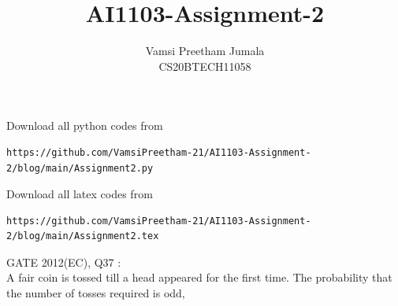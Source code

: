 \documentclass[journal,12pt,twocolumn]{IEEEtran}
\begin{document}
     \def\rightbox#1{\makebox[0in][r]{#1}}
     \def\centbox#1{\makebox[0in]{#1}}
     \def\topbox#1{\raisebox{-\baselineskip}[0in][0in]{#1}}
     \def\midbox#1{\raisebox{-0.5\baselineskip}[0in][0in]{#1}}
\vspace{3cm}
\newtheorem{theorem}{Theorem}[section]
\newtheorem{corollary}{Corollary}[theorem]
\newtheorem{lemma}[theorem]{Lemma}
\title{AI1103-Assignment-2}
\author{Vamsi Preetham Jumala\\CS20BTECH11058}
\maketitle
\newpage
\bigskip
\renewcommand{\thefigure}{\theenumi}
\renewcommand{\thetable}{\theenumi}



Download all python codes from
\begin{lstlisting}
https://github.com/VamsiPreetham-21/AI1103-Assignment-2/blog/main/Assignment2.py
\end{lstlisting}

Download all latex codes from
\begin{lstlisting}
https://github.com/VamsiPreetham-21/AI1103-Assignment-2/blog/main/Assignment2.tex
\end{lstlisting}


GATE 2012(EC), Q37 :\\
A fair coin is tossed till a head appeared for the first time. The probability that the number of tosses required is odd,\\
\end{document}
